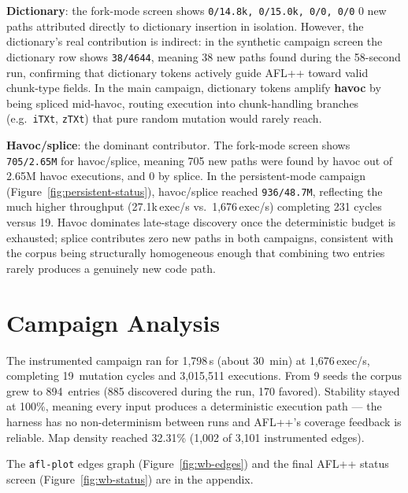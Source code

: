 \setlength{\parindent}{0pt}
\vspace{4pt}
\textbf{Dictionary}: the fork-mode screen shows
\verb|0/14.8k, 0/15.0k, 0/0, 0/0|  0 new paths attributed
directly to dictionary insertion in isolation. However, the
dictionary's real contribution is indirect: in the synthetic
campaign screen the dictionary row shows \verb|38/4644|, meaning
38 new paths found during the 58-second run, confirming that
dictionary tokens actively guide AFL++ toward valid chunk-type
fields. In the main campaign, dictionary tokens amplify
\textbf{havoc} by being spliced mid-havoc, routing execution into
chunk-handling branches (e.g.\ \verb|iTXt|, \verb|zTXt|) that
pure random mutation would rarely reach.

\setlength{\parindent}{0pt}
\vspace{4pt}
\textbf{Havoc/splice}: the dominant contributor. The fork-mode
screen shows \verb|705/2.65M| for havoc/splice, meaning 705 new
paths were found by havoc out of 2.65M havoc executions, and 0
by splice. In the persistent-mode campaign
(Figure~\ref{fig:persistent-status}), havoc/splice reached
\verb|936/48.7M|, reflecting the much higher throughput
(27.1k\,exec/s vs.\ 1,676\,exec/s) completing 231 cycles versus
19. Havoc dominates late-stage discovery once the deterministic
budget is exhausted; splice contributes zero new paths in both
campaigns, consistent with the corpus being structurally
homogeneous enough that combining two entries rarely produces
a genuinely new code path.

\vspace{-10pt}
\section{Campaign Analysis}
\vspace{-8pt}
The instrumented campaign ran for 1{,}798\,s (about 30~min) at
1{,}676\,exec/s, completing 19~mutation cycles and 3{,}015{,}511
executions. From 9 seeds the corpus grew to 894~entries (885 discovered
during the run, 170 favored). Stability stayed at 100\%, meaning every
input produces a deterministic execution path --- the harness has no
non-determinism between runs and AFL++'s coverage feedback is reliable.
Map density reached 32.31\% (1{,}002 of 3{,}101 instrumented edges).

The \texttt{afl-plot} edges graph (Figure~\ref{fig:wb-edges}) and the
final AFL++ status screen (Figure~\ref{fig:wb-status}) are in the
appendix.
\vspace{-8pt}
